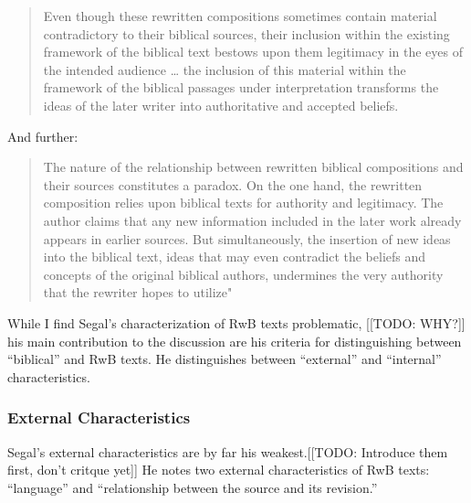  \begin{quote} Even though these rewritten compositions sometimes contain material contradictory to their biblical sources, their inclusion within the existing framework of the biblical text bestows upon them legitimacy in the eyes of the intended audience \ldots{} the inclusion of this material within the framework of the biblical passages under interpretation transforms the ideas of the later writer into authoritative and accepted beliefs.\autocite[11]{segal_henze2005} \end{quote} 

 And further: 

 \begin{quote} The nature of the relationship between rewritten biblical compositions and their sources constitutes a paradox. On the one hand, the rewritten composition relies upon biblical texts for authority and legitimacy. The author claims that any new information included in the later work already appears in earlier sources. But simultaneously, the insertion of new ideas into the biblical text, ideas that may even contradict the beliefs and concepts of the original biblical authors, undermines the very authority that the rewriter hopes to utilize"\autocite[11-12]{segal_henze2005} \end{quote} 

 While I find Segal's characterization of RwB texts problematic, [[TODO: WHY?]] his main contribution to the discussion are his criteria for distinguishing between ``biblical'' and RwB texts. He distinguishes between ``external'' and ``internal'' characteristics. 

 \hypertarget{external-characteristics}{%
\subsubsection{External Characteristics}\label{external-characteristics}} 

 Segal's external characteristics are by far his weakest.[[TODO: Introduce them first, don't critque yet]] He notes two external characteristics of RwB texts: ``language'' and ``relationship between the source and its revision.'' 

